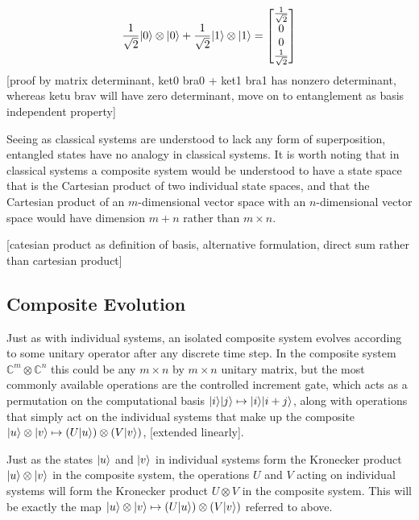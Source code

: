 \[\frac{1}{\sqrt{2}}| 0 \rangle\otimes| 0 \rangle + \frac{1}{\sqrt{2}}| 1 \rangle\otimes| 1 \rangle = \left[\begin{matrix}
\frac{1}{\sqrt{2}}\\
0\\
0\\
\frac{1}{\sqrt{2}}
\end{matrix}\right]\]
[proof by matrix determinant, ket0 bra0 + ket1 bra1 has nonzero determinant, whereas ketu brav will have zero determinant, move on to entanglement as basis independent property]

Seeing as classical systems are understood to lack any form of superposition, entangled states have no analogy in classical systems. It is worth noting that in classical systems a composite system would be understood to have a state space that is the Cartesian product of two individual state spaces, and that the Cartesian product of an $m$-dimensional vector space with an $n$-dimensional vector space would have dimension $m+n$ rather than $m\times n$.

[catesian product as definition of basis, alternative formulation, direct sum rather than cartesian product]
\subsection{Composite Evolution}
Just as with individual systems, an isolated composite system evolves according to some unitary operator after any discrete time step. In the composite system $\mathbb{C}^m\otimes\mathbb{C}^n$ this could be any $m \times n$ by $m \times n$ unitary matrix, but the most commonly available operations are the controlled increment gate, which acts as a permutation on the computational basis $| i \rangle| j \rangle \mapsto | i \rangle| i+j \rangle$, along with operations that simply act on the individual systems that make up the composite $| u \rangle\otimes| v \rangle \mapsto (U| u \rangle)\otimes(V| v \rangle)$, [extended linearly].

Just as the states $| u \rangle$ and $| v \rangle$ in individual systems form the Kronecker product $| u \rangle\otimes| v \rangle$ in the composite system, the operations $U$ and $V$ acting on individual systems will form the Kronecker product $U\otimes V$ in the composite system. This will be exactly the map $| u \rangle\otimes| v \rangle \mapsto (U| u \rangle)\otimes(V| v \rangle)$ referred to above.

